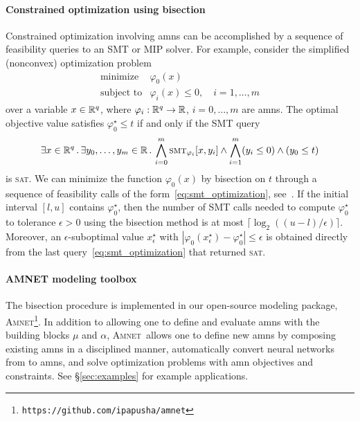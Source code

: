 \documentclass[10pt]{article}
\newcommand{\amn}{\varphi}
\newcommand{\smt}{\mbox{\sc smt}}
\newcommand{\amnet}{\textsc{Amnet}}
\theoremstyle{remark}
\theoremstyle{definition}
\theoremstyle{plain}
\begin{document}
\paragraph{Constrained optimization using bisection}
Constrained optimization involving \acsp{amn} can be accomplished by a sequence
of feasibility queries to an SMT or MIP solver. For example, consider the
simplified (nonconvex) optimization problem
\begin{equation}
	\label{eq:optimization2}
	\begin{array}{ll}
		\mbox{minimize}   & \amn_0(x) \\
		\mbox{subject to} & \amn_i(x) \leq 0, \quad i=1,\ldots,m
	\end{array}
\end{equation}
over a variable $x\in\mathbb{R}^q$, where $\amn_i : \reals^q\to\reals$,
$i=0,\ldots,m$ are \acsp{amn}. The optimal objective value satisfies
$\amn_0^\star \leq t$ if and only if the SMT query
\begin{equation}
	\label{eq:smt_optimization}
	\exists x \in \reals^q \, . \,
	\exists y_0,\ldots,y_m \in \reals \, . \,
	\bigwedge_{i=0}^{m} \smt_{\amn_i}[x,y_i] 
	\wedge
	\bigwedge_{i=1}^{m} (y_i \leq 0)
	\wedge
	(y_0 \leq t)
\end{equation}
is \textsc{sat}. We can minimize the function $\amn_0(x)$ by bisection on $t$
through a sequence of feasibility calls of the
form~\eqref{eq:smt_optimization}, see~\cite[\S{4.2.5}]{Boyd:2004}. If the
initial interval $[l,u]$ contains $\amn^\star_0$, then the number of SMT
calls needed to compute $\amn_0^\star$ to tolerance $\epsilon > 0$ using the
bisection method is at most $\lceil\log_2((u-l)/\epsilon) \rceil$. Moreover, an
$\epsilon$-suboptimal value $x^\star_\epsilon$ with $|\amn_0(x^\star_\epsilon)
- \amn_0^\star| \leq \epsilon$ is obtained directly from the last
query~\eqref{eq:smt_optimization} that returned \textsc{sat}. 

\paragraph{AMNET modeling toolbox}
The bisection procedure is implemented in our open-source modeling package,
\amnet\footnote{\texttt{https://github.com/ipapusha/amnet}}. In addition to
allowing one to define and evaluate \acsp{amn} with the building blocks $\mu$
and $\alpha$, \amnet\ allows one to define new \acsp{amn} by composing existing
\acsp{amn} in a disciplined manner, automatically convert neural networks from
to \acsp{amn}, and solve optimization problems with \acs{amn} objectives and
constraints. See \S\ref{sec:examples} for example applications.
\end{document}
